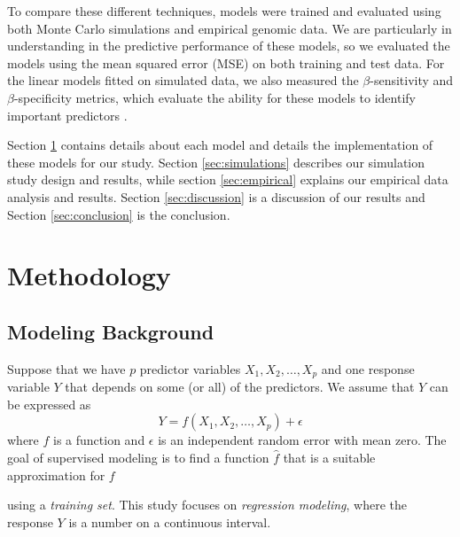\documentclass[final,onefignum,onetabnum]{siuro210301}
\begin{document}
	To compare these different techniques, models were trained and evaluated using both Monte Carlo simulations and empirical genomic data. We are particularly in understanding in the predictive performance of these models, so we evaluated the models using the mean squared error (MSE) on both training and test data. For the linear models fitted on simulated data, we also measured the $\beta$-sensitivity and $\beta$-specificity metrics, which evaluate the ability for these models to identify important predictors \cite{liu2020logsum}.
	
	Section \ref{sec:methodology} contains details about each model and details the implementation of these models for our study. Section \ref{sec:simulations} describes our simulation study design and results, while section \ref{sec:empirical} explains our empirical data analysis and results. Section \ref{sec:discussion} is a discussion of our results and Section \ref{sec:conclusion} is the conclusion.
	
	\section{Methodology}\label{sec:methodology}
	\subsection{Modeling Background}
	
	Suppose that we have $p$ predictor variables $X_1, X_2, \dotsc, X_p$ and one response variable $Y$ that depends on some (or all) of the predictors. We assume that $Y$ can be expressed as
	\begin{equation}\label{eqn:relationship}
		Y = f(X_1, X_2, \dotsc, X_p) + \epsilon
	\end{equation}
	where $f$ is a function and $\epsilon$ is an independent random error with mean zero. The goal of supervised modeling is to find a function $\hat{f}$ that is a suitable approximation for $f$ 

	using a \textit{training set}. This study focuses on \textit{regression modeling}, where the response $Y$ is a number on a continuous interval.
	
\end{document}
